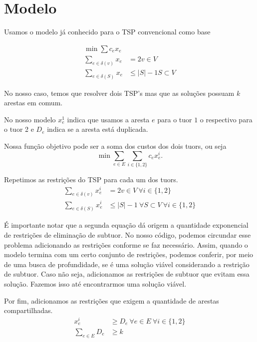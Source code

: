 \documentclass[11pt]{article}
\author{Ieremies Vieira da Fonseca Romero}
\date{\today}
\title{}
\theoremstyle{definition}
\theoremstyle{definition}
\theoremstyle{remark}
\theoremstyle{remark}
\theoremstyle{remark}
\theoremstyle{remark}
\theoremstyle{definition}
\begin{document}
\tableofcontents

\section{Modelo}
\label{sec:org8127e03}

Usamos o modelo já conhecido para o TSP convencional como base

\begin{align*}
\min \sum c_{e} x_{e}& \\
\sum \limits_{e \in \delta(v)} x_{e} &= 2 v \in V \\
\sum \limits_{e \in \delta(S)} x_{e} &\leq |S| -1 S \subset V
\end{align*}

No nosso caso, temos que resolver dois TSP's mas que as soluções possuam \(k\) arestas em comum.

No nosso modelo \(x_{e}^{1}\) indica que usamos a aresta \(e\) para o tuor \(1\) o respectivo para o tuor 2 e \(D_{e}\) indica se a aresta está duplicada.

Nossa função objetivo pode ser a soma dos custos dos dois tuors, ou seja
\[  \min \sum \limits_{e \in E} \sum \limits_{i \in \{1,2\}} c_{e} x_{e}^{i}. \]

Repetimos as restrições do TSP para cada um dos tuors.
\begin{align*}
\sum \limits_{e \in \delta(v)} x_{e}^{i} &= 2 v \in V \ \forall i \in \{1,2\} \\
\sum \limits_{e \in \delta(S)} x_{e}^{i} &\leq |S| -1 \ \forall S \subset V \ \forall i \in \{1,2\}
\end{align*}

É importante notar que a segunda equação dá origem a quantidade exponencial de restrições de eliminação de subtuor. No nosso código, podemos circundar esse problema adicionando as restrições conforme se faz necessário. Assim, quando o modelo termina com um certo conjunto de restrições, podemos conferir, por meio de uma busca de profundidade, se é uma solução viável considerando a restrição de subtuor. Caso não seja, adicionamos as restrições de subtuor que evitam essa solução. Fazemos isso até encontrarmos uma solução viável.

Por fim, adicionamos as restrições que exigem a quantidade de arestas compartilhadas.
\begin{align*}
x_{e}^{i} &\geq D_{e} \ \forall e \in E \ \forall i \in \{1,2\} \\
\sum \limits_{e \in E} D_{e} &\geq k
\end{align*}
\end{document}
